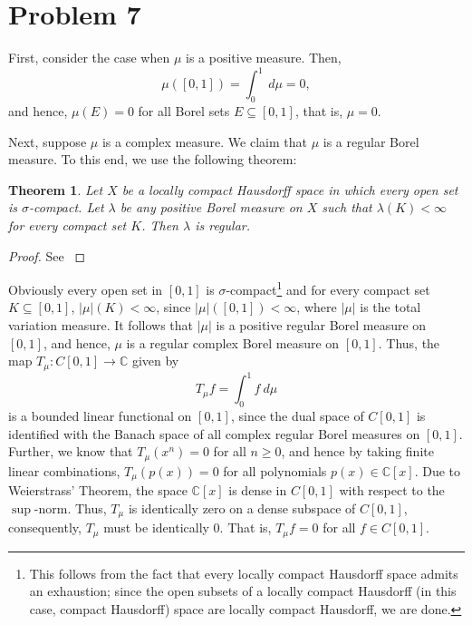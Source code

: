 \documentclass[10pt]{amsart}
\theoremstyle{thmstyle}
\newtheorem{theorem}{Theorem}[section]
\theoremstyle{defstyle}
\newcommand{\bbC}{\mathbb{C}}
\renewcommand{\ge}{\geqslant}
\begin{document}
\section{Problem 7}

First, consider the case when $\mu$ is a positive measure. Then, 
\begin{equation*}
	\mu\left([0, 1]\right) = \int_0^1 ~d\mu = 0,
\end{equation*}
and hence, $\mu(E) = 0$ for all Borel sets $E\subseteq[0, 1]$, that is, $\mu = 0$.

Next, suppose $\mu$ is a complex measure. We claim that $\mu$ is a regular Borel measure. To this end, we use the following theorem: 

\begin{theorem}
	Let $X$ be a locally compact Hausdorff space in which every open set is $\sigma$-compact. Let $\lambda$ be any positive Borel measure on $X$ such that $\lambda(K) < \infty$ for every compact set $K$. Then $\lambda$ is regular.
\end{theorem}
\begin{proof}
	See \cite[Theorem 2.17]{papa-rudin}
\end{proof}

Obviously every open set in $[0, 1]$ is $\sigma$-compact\footnote{This follows from the fact that every locally compact Hausdorff space admits an exhaustion; since the open subsets of a locally compact Hausdorff (in this case, compact Hausdorff) space are locally compact Hausdorff, we are done.} and for every compact set $K\subseteq[0, 1]$, $|\mu|(K) < \infty$, since $|\mu|([0, 1]) < \infty$, where $|\mu|$ is the total variation measure. It follows that $|\mu|$ is a positive regular Borel measure on $[0, 1]$, and hence, $\mu$ is a regular complex Borel measure on $[0, 1]$. Thus, the map $T_\mu: C[0, 1]\to\bbC$ given by 
\begin{equation*}
	T_\mu f = \int_0^1 f~d\mu
\end{equation*}
is a bounded linear functional on $[0, 1]$, since the dual space of $C[0, 1]$ is identified with the Banach space of all complex regular Borel measures on $[0, 1]$. Further, we know that $T_\mu(x^n) = 0$ for all $n\ge 0$, and hence by taking finite linear combinations, $T_\mu(p(x)) = 0$ for all polynomials $p(x)\in\bbC[x]$. Due to Weierstrass' Theorem, the space $\bbC[x]$ is dense in $C[0, 1]$ with respect to the $\sup$-norm. Thus, $T_\mu$ is identically zero on a dense subspace of $C[0, 1]$, consequently, $T_\mu$ must be identically $0$. That is, $T_\mu f = 0$ for all $f\in C[0, 1]$.
\end{document}
